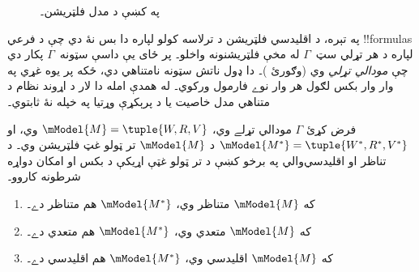 \documentclass[../../../include/open-logic-section]{subfiles}
\begin{document}
\begin{figure}[ht]
  \centering
  \caption{په  کښې د مدل فلټريشن۔}
\end{figure}

په تېره، د اقليدسي فلټريشن د ترلاسه کولو لپاره دا بس نۀ دي چې
د فرعي !!{formula}s لپاره د هر تړلي سټ~$\Gamma$ له مخې
فلټريشنونه واخلو۔ پر ځای يې داسې سټونه~$\Gamma$ پکار دي چې
\emph{مودالي تړلي} وي (وګورئ
)۔ دا ډول ناتش سټونه نامتناهي دي، ځکه پر يوه غړي په وار وار
بکس لګول هر وار نوے فارمول ورکوي۔ له همدې امله دا لار د اړوند
نظام د متناهي مدل خاصيت يا د پرېکړې وړتيا په خپله نۀ ثابتوي۔

\begin{thm}
  فرض کړئ $\Gamma$ مودالي تړلے وي،
  $\mModel{M}=\tuple{W,R,V}$ وي، او
  $\mModel{M^*} = \tuple{W^*,R^*,V^*}$ د
  $\mModel{M}$ تر ټولو غټ فلټريشن وي۔ د تناظر او اقليدسي‌والي
  په برخو کښې د تر ټولو غټې اړيکې د بکس او امکان دواړه شرطونه
  کاروو۔
  \begin{enumerate}
  \item که $\mModel{M}$ متناظر وي، $\mModel{M^*}$ هم متناظر دے۔
  \item که $\mModel{M}$ متعدي وي، $\mModel{M^*}$ هم متعدي دے۔
  \item که $\mModel{M}$ اقليدسي وي، $\mModel{M^*}$ هم اقليدسي دے۔
  \end{enumerate}
\end{thm}
\end{document}
